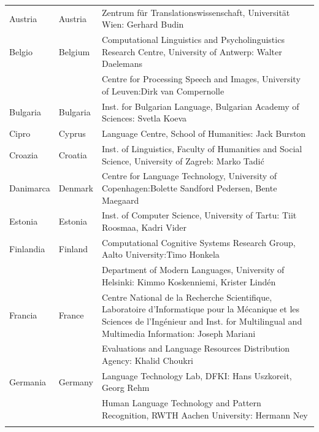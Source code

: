 \small
\begin{longtable}{llp{110mm}}
  
  Austria & \textcolor{grey1}{Austria} & Zentrum für Translationswissenschaft, Universität Wien: Gerhard Budin\\ \addlinespace 
  Belgio & \textcolor{grey1}{Belgium} & Computational Linguistics and Psycholinguistics Research Centre, University of Antwerp: Walter Daelemans\\ \addlinespace
  & & Centre for Processing Speech and Images, University of Leuven:\newline Dirk van Compernolle \\ \addlinespace
  Bulgaria & \textcolor{grey1}{Bulgaria} & Inst. for Bulgarian Language, Bulgarian Academy of Sciences: Svetla Koeva \\ \addlinespace
  Cipro & \textcolor{grey1}{Cyprus} & Language Centre, School of Humanities: Jack Burston \\ \addlinespace
  Croazia & \textcolor{grey1}{Croatia} & Inst. of Linguistics, Faculty of Humanities and Social Science, University of Zagreb: Marko Tadić \\ \addlinespace
  Danimarca &  \textcolor{grey1}{Denmark} & Centre for Language Technology, University of Copenhagen:\newline Bolette Sandford Pedersen, Bente Maegaard\\ \addlinespace
  Estonia & \textcolor{grey1}{Estonia} & Inst. of Computer Science, University of Tartu: Tiit Roosmaa, Kadri Vider\\ \addlinespace
  Finlandia & \textcolor{grey1}{Finland} & Computational Cognitive Systems Research Group, Aalto University:\newline Timo Honkela\\ \addlinespace
  & & Department of Modern Languages, University of Helsinki: Kimmo Koskenniemi, Krister Lindén \\ \addlinespace
  Francia & \textcolor{grey1}{France} & Centre National de la Recherche Scientifique, Laboratoire d'Informatique pour la Mécanique et les Sciences de l'Ingénieur and Inst. for Multilingual and Multimedia Information: Joseph Mariani \\ \addlinespace
  & & Evaluations and Language Resources Distribution Agency: Khalid Choukri\\ \addlinespace 
  Germania & \textcolor{grey1}{Germany} & Language Technology Lab, DFKI: Hans Uszkoreit, Georg Rehm\\ \addlinespace
  & & Human Language Technology and Pattern Recognition, RWTH Aachen University: Hermann Ney \\ \addlinespace

\end{longtable}
